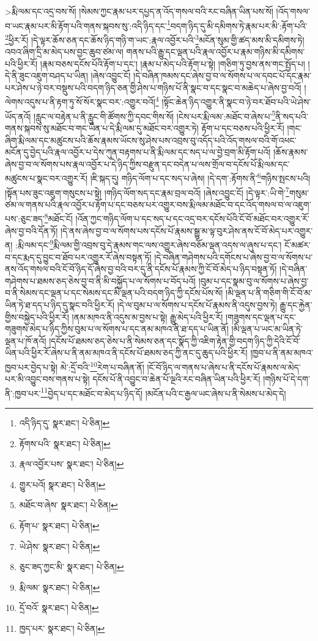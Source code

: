  >རྨི་ལམ་དང་འདྲ་བས་སོ། །སེམས་ཀྱང་རྣམ་པར་དཔྱད་ན་འོད་གསལ་བའི་རང་བཞིན་ཡིན་པས་སོ། །འོད་གསལ་བ་ཡང་རྣམ་པར་མི་རྟོག་པའི་གནས་སྐབས་སུ་:འདི་ཉིད་དང་\footnote{འདི་ཉིད་དུ་  སྣར་ཐང་།  པེ་ཅིན། }བདག་ཉིད་དུ་མི་དམིགས་ཏེ་རྣམ་པར་མི་:རྟོག་པའི་\footnote{རྟོགས་པའི་  སྣར་ཐང་།  པེ་ཅིན། }ཕྱིར་རོ། །དེ་ལྟར་ཆོས་ཅན་དང་ཆོས་ཉིད་གཉི་ག་ཡང་:རྣལ་འབྱོར་པའི་\footnote{རྣལ་འབྱོར་པས་  སྣར་ཐང་།  པེ་ཅིན། }མངོན་སུམ་གྱི་ཚད་མས་མི་དམིགས་ཏེ། འབའ་ཞིག་དྲི་མ་མེད་པས་བྱང་ཆུབ་ཙམ་ལ། གནས་པའི་རྒྱུ་དང་ལྡན་པའི་རྣལ་འབྱོར་པ་རྣམ་གཉིས་མི་དམིགས་པའི་ཕྱིར་རོ། །རྣམ་བཅས་དངོས་པོའི་རྟོག་པ་དང་། །རྣམ་པ་མེད་པའི་རྟོག་པ་སྟེ། །གཅིག་ཏུ་བྱས་ནས་གང་སྤྱོད་པ། །དེ་ནི་ཟུང་འཇུག་བཤད་པ་ཡིན། །ཞེས་འབྱུང་ངོ། །དེ་བཞིན་ཁམས་དང་ཞེས་བྱ་བ་ལ་སོགས་པ་ལ་དབང་པོ་དང་རྣམ་པར་ཤེས་པ་ཉེ་བར་བསྡུས་པའི་བདག་ཉིད་ཅན་གྱི་ཤེས་པ་གཉིས་པོ་ནི་སྣང་བ་དང་སྣང་བ་མཆེད་པ་ཞེས་བྱ་བའོ། །ལེགས་འདུས་པ་ནི་རྟག་ཏུ་སོ་སོར་སྣང་བར་:འགྱུར་བའོ།\footnote{གྱུར་པའོ།  སྣར་ཐང་།  པེ་ཅིན། } །སྟོང་ཆེན་ཉིད་འགྱུར་ནི་སྣང་བ་ཉེ་བར་ཐོབ་པའི་ཡེ་ཤེས་ཡོད་ནའོ། །རླུང་ལ་བརྟེན་པ་ནི་རླུང་གི་ཚོགས་ཀྱི་དབང་གིས་སོ། །ངེས་པར་རྨི་ལམ་:མཐོང་བ་ཞེས་པ་\footnote{མཐོང་བ་ཞེས་  སྣར་ཐང་།  པེ་ཅིན། }ནི་སད་པའི་གནས་སྐབས་སུ་མཐོང་བ་གང་ཡིན་པ་དེ་རྨི་ལམ་དུ་མཐོང་བར་འགྱུར་ཏེ། རྟོག་པ་དང་བཅས་པའི་ཕྱིར་རོ། །གང་ཞིག་རྨི་ལམ་དང་མཚུངས་པའི་ཆོས་རྣམས་ཡོངས་སུ་ཤེས་པས་འབྲས་བུ་འདོད་པའི་འོད་གསལ་བའི་གོ་འཕང་མངོན་དུ་བྱེད་པའི་རྣལ་འབྱོར་པ་དེས་ཀུན་བརྟགས་པ་ནི་རྨི་ལམ་དང་སད་པ་ལ་བྱེ་བྲག་མི་རྟོག་པའོ། །ཆོས་རྣམས་ཞེས་བྱ་བ་ལ་སོགས་པས་རྣལ་འབྱོར་པ་དེ་ཉིད་ཀྱིས་བརྫུན་དང་བདེན་པ་ལས་གྲོལ་བ་དངོས་པོ་རྨི་ལམ་དང་མཚུངས་པ་སྣང་བར་འགྱུར་རོ། །ཇི་སྐད་དུ། གཉིད་ལོག་པ་དང་སད་པ་ཞེས། །དེ་དག་:རྟོགས་ནི་\footnote{རྟོག་པ་  སྣར་ཐང་།  པེ་ཅིན། }གཉིས་སྤངས་པའི། །སྟོན་པས་ཟུང་འཇུག་གསུངས་པ་སྟེ། །གཉིད་ལོག་སད་དང་རྣམ་བྲལ་བའོ། །ཞེས་འབྱུང་ངོ། །དེ་ལྟར་:ཡི་གེ་\footnote{ཡེ་ཤེས་  སྣར་ཐང་།  པེ་ཅིན། }གསུམ་ཙམ་ལ་གནས་པའི་རྣལ་འབྱོར་པ་རྟོག་པ་དང་བཅས་པར་འགྱུར་བས་རྨི་ལམ་མཐོང་བ་དང་འོད་གསལ་བ་ལ་འཇུག་པས་:ཅུང་ཟད་\footnote{ཅུང་ཟད་ཀྱང་མི་  སྣར་ཐང་།  པེ་ཅིན། }མཐོང་ངོ། །འོན་ཀྱང་གཉིད་ལོག་པ་དང་སད་པ་དང་འདྲ་བར་དངོས་པོའི་ངོ་བོ་མཐོང་བར་འགྱུར་རོ་ཞེས་བྱ་བའི་དོན་ཏོ། །དེ་ནས་ཞེས་བྱ་བ་ལ་སོགས་པས་དངོས་པོ་རྣམས་སྒྱུ་མ་ལྟ་བུར་ཤེས་ནས་ངོ་བོ་མེད་པར་འགྱུར་ན། :རྨི་ལམ་དང་\footnote{རྨི་ལམ་  སྣར་ཐང་།  པེ་ཅིན། }རྨི་ལམ་གྱི་འབྲས་བུ་དེ་རྣམས་གང་ལས་འགྱུར་ཞེས་བཅོམ་ལྡན་འདས་ལ་ཞུས་པ་དང་། ངོ་མཚར་བ་དང་རྨད་དུ་བྱུང་བ་ཐོབ་པར་འགྱུར་རོ་ཞེས་བསྟན་ཏོ། །དེ་བཞིན་གཤེགས་པའི་དགོངས་པ་ཞེས་བྱ་བ་ལ་སོགས་པ་ནས་འོད་གསལ་བའི་ངོ་བོ་ཉིད་དོ་ཞེས་བྱ་བའི་བར་དུ་ནི་དངོས་པོ་རྣམས་ཀྱི་ངོ་བོ་མེད་པ་ཉིད་བསྟན་ཏོ། །དེ་བཞིན་གཤེགས་པ་ཐམས་ཅད་ཅེས་བྱ་བ་ནི་མི་བསྐྱོད་པ་ལ་སོགས་པ་བོད་པའོ། །བུམ་པ་དང་སྣམ་བུ་ལ་སོགས་པ་ཞེས་བྱ་བ་ནི་སེམས་དང་ལྡན་པ་དང་སེམས་དང་མི་ལྡན་པའི་བདག་ཉིད་ཀྱི་དངོས་པོས་སོ། །མི་ལྡན་པ་ནི་གཅིག་གི་ངོ་བོ་མ་ཡིན་ཏེ་ཐ་དད་པ་ཉིད་དུ་སྣང་བའི་ཕྱིར་རོ། །དེ་ལ་བུམ་པ་ལ་སོགས་པ་དངོས་པོ་རྣམས་ནི་འདུས་བྱས་ཏེ། རྒྱུ་དང་རྐྱེན་གྱིས་བསྐྱེད་པའི་ཕྱིར་རོ། །ནམ་མཁའ་ནི་འདུས་མ་བྱས་པ་སྟེ། རྒྱུ་མེད་པའི་ཕྱིར་རོ། །གཟུགས་དང་ལྡན་པ་དང་གཟུགས་མེད་པ་ཉིད་ཀྱིས་བུམ་པ་ལ་སོགས་པ་དང་ནམ་མཁའ་ནི་ཐ་དད་པ་ཡིན་ནོ། །མི་ལྡན་པ་ཡང་མ་ཡིན་ཏེ་ལྡན་པ་ཁོ་ནའོ། །དངོས་པོ་ཐམས་ཅད་ཅེས་པ་ནི་སེམས་ཅན་དང་སྣོད་ཀྱི་འཇིག་རྟེན་གྱི་བདག་ཉིད་ཀྱི་དེའི་ངོ་བོ་ཡིན་པའི་ཕྱིར་རོ་ཞེས་པ་ནི་ནམ་མཁའ་ནི་དངོས་པོ་ཐམས་ཅད་ཀྱི་ནང་དུ་ཆུད་པའི་ཕྱིར་རོ། །ཁྱབ་པ་ནི་ནམ་མཁའ་ཁྱབ་པར་བྱེད་པ་སྟེ། མེ་:དྲོ་བའི་\footnote{དྲོ་བའོ་  སྣར་ཐང་།  པེ་ཅིན། }རེག་པ་བཞིན་ནོ། །ངོ་བོ་ཉིད་ལ་གནས་པ་ཞེས་པ་ནི་དངོས་པོ་རྣམས་ལ་མེད་པར་མི་འབྱུང་བས་གནས་པ་སྟེ། དངོས་པོ་ནི་འབྱུང་བ་ཆེན་པོ་ལྔའི་རང་བཞིན་ཡིན་པའི་ཕྱིར་རོ། །གཉིས་པོ་དེ་དག་ནི་:ཁྱབ་པར་\footnote{ཁྱད་པར་  སྣར་ཐང་།  པེ་ཅིན། }བྱེད་པ་དང་མཐོང་བ་མེད་པ་ཉིད་དོ། །མངོན་པའི་ང་རྒྱལ་ཡང་ཞེས་པ་ནི་སེམས་པ་མེད་དེ། 